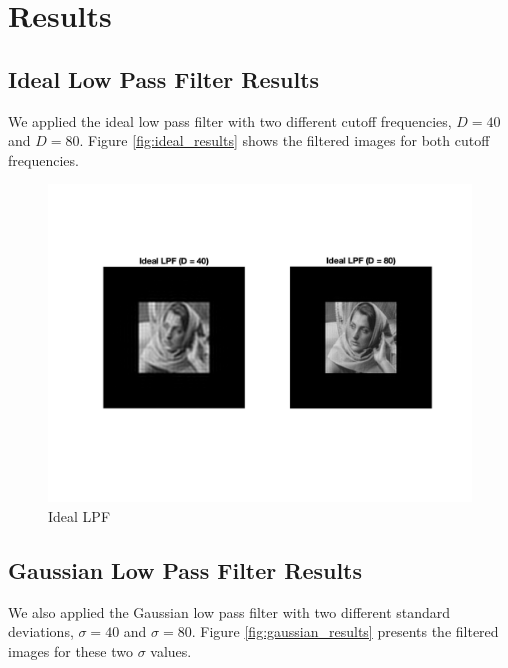 \documentclass{article}
\begin{document}
\section{Results}

\subsection{Ideal Low Pass Filter Results}
We applied the ideal low pass filter with two different cutoff frequencies, \(D = 40\) and \(D = 80\). Figure \ref{fig:ideal_results} shows the filtered images for both cutoff frequencies.

\begin{figure}[H]
    \centering
        \centering
        \includegraphics[width=\linewidth]{Ideal_Low_Pass.png}
        \caption{Ideal LPF}
    
\end{figure}

\subsection{Gaussian Low Pass Filter Results}
We also applied the Gaussian low pass filter with two different standard deviations, \(\sigma = 40\) and \(\sigma = 80\). Figure \ref{fig:gaussian_results} presents the filtered images for these two \(\sigma\) values.
\end{document}
